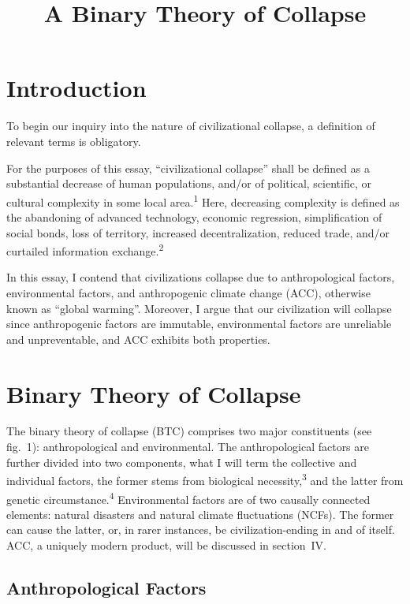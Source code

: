 \documentclass[12pt]{article}
\title{A Binary Theory of Collapse}
\author{}
\date{}
\begin{document}
\maketitle

\section{Introduction}

To begin our inquiry into the nature of civilizational collapse, a definition of relevant terms is obligatory.

For the purposes of this essay, ``civilizational collapse'' shall be defined as a substantial decrease of human populations, and/or of political, scientific, or cultural complexity in some local area.\textsuperscript{1} Here, decreasing complexity is defined as the abandoning of advanced technology, economic regression, simplification of social bonds, loss of territory, increased decentralization, reduced trade, and/or curtailed information exchange.\textsuperscript{2}

In this essay, I contend that civilizations collapse due to anthropological factors, environmental factors, and anthropogenic climate change (ACC), otherwise known as ``global warming''. Moreover, I argue that our civilization will collapse since anthropogenic factors are immutable, environmental factors are unreliable and unpreventable, and ACC exhibits both properties.

\section{Binary Theory of Collapse}

The binary theory of collapse (BTC) comprises two major constituents (see fig.\ 1): anthropological and environmental. The anthropological factors are further divided into two components, what I will term the collective and individual factors, the former stems from biological necessity,\textsuperscript{3} and the latter from genetic circumstance.\textsuperscript{4} Environmental factors are of two causally connected elements: natural disasters and natural climate fluctuations (NCFs). The former can cause the latter, or, in rarer instances, be civilization-ending in and of itself. ACC, a uniquely modern product, will be discussed in section~IV.

\subsection{Anthropological Factors}
\end{document}
